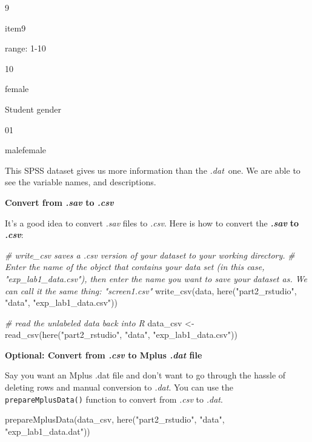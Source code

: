 \documentclass[
]{article}
\newenvironment{Shaded}{\begin{snugshade}}{\end{snugshade}}
\newcommand{\CommentTok}[1]{\textcolor[rgb]{0.56,0.35,0.01}{\textit{#1}}}
\newcommand{\FunctionTok}[1]{\textcolor[rgb]{0.00,0.00,0.00}{#1}}
\newcommand{\NormalTok}[1]{#1}
\newcommand{\OtherTok}[1]{\textcolor[rgb]{0.56,0.35,0.01}{#1}}
\newcommand{\StringTok}[1]{\textcolor[rgb]{0.31,0.60,0.02}{#1}}
\begin{document}
9

item9

range: 1-10

10

female

Student gender

01

malefemale

This SPSS dataset gives us more information than the \emph{.dat}~one. We
are able to see the variable names, and descriptions.

\textbf{Convert from \emph{.sav} to \emph{.csv}}

It's a good idea to convert \emph{.sav} files to \emph{.csv}. Here is
how to convert the \textbf{\emph{.sav}} \textbf{to \emph{.csv}}:

\begin{Shaded}
\begin{Highlighting}[]
\CommentTok{\# write\_csv saves a .csv version of your dataset to your working directory.}
\CommentTok{\# Enter the name of the object that contains your data set (in this case, "exp\_lab1\_data.csv"), then enter the name you want to save your dataset as. We can call it the same thing: "screen1.csv"}
\FunctionTok{write\_csv}\NormalTok{(data, }\FunctionTok{here}\NormalTok{(}\StringTok{"part2\_rstudio"}\NormalTok{, }\StringTok{"data"}\NormalTok{, }\StringTok{"exp\_lab1\_data.csv"}\NormalTok{))}

\CommentTok{\# read the unlabeled data back into R}
\NormalTok{data\_csv }\OtherTok{\textless{}{-}} \FunctionTok{read\_csv}\NormalTok{(}\FunctionTok{here}\NormalTok{(}\StringTok{"part2\_rstudio"}\NormalTok{, }\StringTok{"data"}\NormalTok{, }\StringTok{"exp\_lab1\_data.csv"}\NormalTok{))}
\end{Highlighting}
\end{Shaded}

\textbf{Optional: Convert from \emph{.csv} to Mplus \emph{.dat} file}

Say you want an Mplus .dat file and don't want to go through the hassle
of deleting rows and manual conversion to \emph{.dat}. You can use the
\texttt{prepareMplusData()} function to convert from \emph{.csv} to
\emph{.dat}.

\begin{Shaded}
\begin{Highlighting}[]
\FunctionTok{prepareMplusData}\NormalTok{(data\_csv, }\FunctionTok{here}\NormalTok{(}\StringTok{"part2\_rstudio"}\NormalTok{, }\StringTok{"data"}\NormalTok{, }\StringTok{"exp\_lab1\_data.dat"}\NormalTok{))}
\end{Highlighting}
\end{Shaded}
\end{document}
